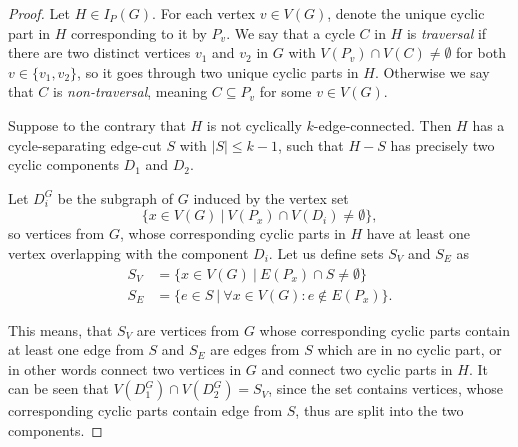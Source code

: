 \documentclass[12pt, twoside]{book}
\begin{document}
\begin{proof}
	Let $H\in I_P(G)$. For each vertex $v\in V(G)$, denote the unique cyclic part in $H$ corresponding to it by $P_v$. We say that a cycle $C$ in $H$ is \textit{traversal} if there are two distinct vertices $v_1$ and $v_2$ in $G$ with $V(P_v)\cap V(C)\neq \emptyset$ for both $v\in\{v_1,v_2\}$, so it goes through two unique cyclic parts in $H$. Otherwise we say that $C$ is \textit{non-traversal}, meaning $C\subseteq P_v$ for some $v\in V(G)$.
	
	Suppose to the contrary that $H$ is not cyclically $k$-edge-connected. Then $H$ has a cycle-separating edge-cut $S$ with $|S|\leq k-1$, such that $H-S$ has precisely two cyclic components $D_1$ and $D_2$.
	
	Let $D_i^G$ be the subgraph of $G$ induced by the vertex set $$\{x\in V(G)~|~ V(P_x)\cap V(D_i)\neq \emptyset\},$$ so vertices from $G$, whose corresponding cyclic parts in $H$ have at least one vertex overlapping with the component $D_i$. Let us define sets $S_V$ and $S_E$ as
	\begin{align*}
		S_V &= \{x\in V(G) ~|~ E(P_x)\cap S\neq \emptyset\} \\
		S_E &= \{e\in S ~|~ \forall x\in V(G): e\notin E(P_x) \}.
	\end{align*}
	
	This means, that $S_V$ are vertices from $G$ whose corresponding cyclic parts contain at least one edge from $S$ and $S_E$ are edges from $S$ which are in no cyclic part, or in other words connect two vertices in $G$ and connect two cyclic parts in $H$. It can be seen that ${V(D_1^G)\cap V(D_2^G)=S_V}$, since the set contains vertices, whose corresponding cyclic parts contain edge from $S$, thus are split into the two components.
	

\end{proof}
\end{document}
